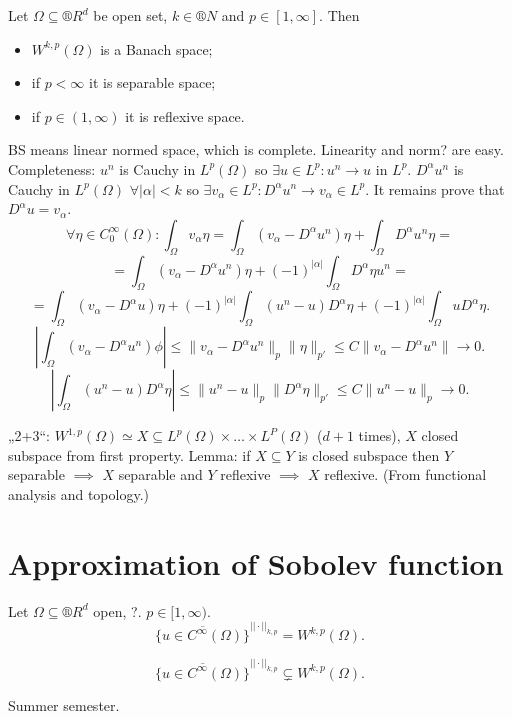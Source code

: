 \documentclass[12pt]{article}					%
\begin{document}
\begin{veta}
	Let $\Omega \subseteq ®R^d$ be open set, $k \in ®N$ and $p \in [1, ∞]$. Then

	\begin{itemize}
		\item $W^{k, p}(\Omega)$ is a Banach space;
		\item if $p < ∞$ it is separable space;
		\item if $p \in (1, ∞)$ it is reflexive space.
	\end{itemize}

	\begin{dukazin}
		BS means linear normed space, which is complete. Linearity and norm? are easy. Completeness: $u^n$ is Cauchy in $L^p(\Omega)$ so $\exists u \in L^p: u^n \rightarrow u$ in $L^p$. $D^\alpha u^n$ is Cauchy in $L^p(\Omega)$ $\forall |\alpha| < k$ so $\exists v_\alpha \in L^p: D^\alpha u^n \rightarrow v_\alpha \in L^p$. It remains prove that $D^\alpha u = v_\alpha$.
		$$ \forall \eta \in C_0^∞(\Omega): \int_\Omega v_\alpha \eta = \int_\Omega (v_\alpha - D^\alpha u^n)\eta + \int_\Omega D^{\alpha}u^n\eta = $$
		$$ = \int_\Omega(v_\alpha - D^\alpha u^n) \eta + (-1)^{|\alpha|} \int_\Omega D^\alpha \eta u^n = $$
		$$ = \int_\Omega(v_\alpha - D^\alpha u) \eta + (-1)^{|\alpha|} \int_\Omega(u^n - u)D^\alpha\eta + (-1)^{|\alpha|}\int_\Omega u D^\alpha \eta. $$
		$$ \left|\int_\Omega (v_\alpha - D^\alpha u^n) \phi\right| ≤ \|v_\alpha - D^\alpha u^n\|_p \|\eta\|_{p'} ≤ C \|v_\alpha - D^\alpha u^n\| \rightarrow 0. $$
		$$ \left|\int_\Omega (u^n - u) D^\alpha \eta\right| ≤ \|u^n - u\|_p \|D^\alpha \eta\|_{p'} ≤ C \|u^n - u\|_p \rightarrow 0. $$

		„2+3“: $W^{1, p}(\Omega) \simeq X \subseteq L^p(\Omega) \times … \times L^P(\Omega)$ ($d+1$ times), $X$ closed subspace from first property. Lemma: if $X \subseteq Y$ is closed subspace then $Y$ separable $\implies$ $X$ separable and $Y$ reflexive $\implies$ $X$ reflexive. (From functional analysis and topology.)
	\end{dukazin}
\end{veta}

\section{Approximation of Sobolev function}
\begin{veta}
	Let $\Omega \subseteq ®R^d$ open, ?. $p \in [1, ∞)$.
	$$ \overline{\{u \in C^∞(\Omega)\}}^{||·||_{k, p}} = W^{k, p}(\Omega). $$

	\begin{upozorneni}
		$$ \overline{\{u \in C^∞(\Omega)\}}^{||·||_{k, p}} \subsetneq W^{k, p}(\Omega). $$
	\end{upozorneni}

	\begin{dukazin}
		Summer semester.
	\end{dukazin}
\end{veta}
\end{document}
